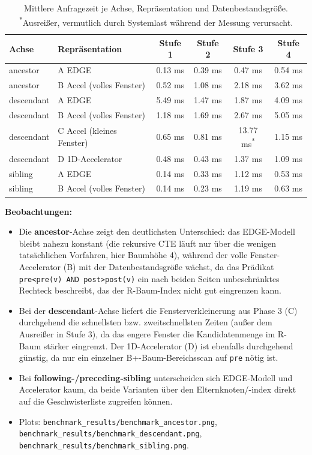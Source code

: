 \documentclass[11pt]{scrartcl}
\begin{document}
\begin{table}[h]
	\centering
	\begin{tabular}{l l c c c c}
		\toprule
		Achse & Repräsentation & Stufe 1 & Stufe 2 & Stufe 3 & Stufe 4 \\
		\midrule
		ancestor   & A EDGE              & 0.13 ms & 0.39 ms & 0.47 ms  & 0.54 ms \\
		ancestor   & B Accel (volles Fenster) & 0.52 ms & 1.08 ms & 2.18 ms  & 3.62 ms \\
		\midrule
		descendant & A EDGE              & 5.49 ms & 1.47 ms & 1.87 ms  & 4.09 ms \\
		descendant & B Accel (volles Fenster) & 1.18 ms & 1.69 ms & 2.67 ms  & 5.05 ms \\
		descendant & C Accel (kleines Fenster) & 0.65 ms & 0.81 ms & 13.77 ms\textsuperscript{*} & 1.15 ms \\
		descendant & D 1D-Accelerator    & 0.48 ms & 0.43 ms & 1.37 ms  & 1.09 ms \\
		\midrule
		sibling    & A EDGE              & 0.14 ms & 0.33 ms & 1.12 ms  & 0.53 ms \\
		sibling    & B Accel (volles Fenster) & 0.14 ms & 0.23 ms & 1.19 ms  & 0.63 ms \\
		\bottomrule
	\end{tabular}
	\caption{Mittlere Anfragezeit je Achse, Repräsentation und Datenbestandsgröße. \textsuperscript{*}Ausreißer, vermutlich durch Systemlast während der Messung verursacht.}
\end{table}

\textbf{Beobachtungen:}
\begin{itemize}
  \item Die \textbf{ancestor}-Achse zeigt den deutlichsten Unterschied: das EDGE-Modell bleibt nahezu konstant (die rekursive CTE läuft nur über die wenigen tatsächlichen Vorfahren, hier Baumhöhe 4), während der volle Fenster-Accelerator (B) mit der Datenbestandsgröße wächst, da das Prädikat \texttt{pre<pre(v) AND post>post(v)} ein nach beiden Seiten unbeschränktes Rechteck beschreibt, das der R-Baum-Index nicht gut eingrenzen kann.
  \item Bei der \textbf{descendant}-Achse liefert die Fensterverkleinerung aus Phase 3 (C) durchgehend die schnellsten bzw. zweitschnellsten Zeiten (außer dem Ausreißer in Stufe 3), da das engere Fenster die Kandidatenmenge im R-Baum stärker eingrenzt. Der 1D-Accelerator (D) ist ebenfalls durchgehend günstig, da nur ein einzelner B+-Baum-Bereichsscan auf \texttt{pre} nötig ist.
  \item Bei \textbf{following-/preceding-sibling} unterscheiden sich EDGE-Modell und Accelerator kaum, da beide Varianten über den Elternknoten/-index direkt auf die Geschwisterliste zugreifen können.
  \item Plots: \texttt{benchmark\_results/benchmark\_ancestor.png}, \texttt{benchmark\_results/benchmark\_descendant.png}, \texttt{benchmark\_results/benchmark\_sibling.png}.
\end{itemize}
\end{document}
